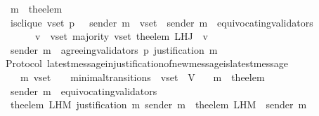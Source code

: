 \begin{isabellebody}
\ \ {\isasymlongrightarrow}\ m{\isacharprime}\ {\isacharequal}\ the{\isacharunderscore}elem\ {\isacharparenleft}{\isasymsigma}{\isacharprime}\ {\isacharminus}\ {\isasymsigma}{\isacharparenright}\isanewline
\ \ {\isasymlongrightarrow}\ is{\isacharunderscore}clique\ {\isacharparenleft}v{\isacharunderscore}set{\isacharcomma}\ p{\isacharcomma}\ {\isasymsigma}{\isacharparenright}\ {\isasymand}\ sender\ m{\isacharprime}\ {\isasymin}\ v{\isacharunderscore}set\ {\isasymand}\ sender\ m{\isacharprime}\ {\isasymnotin}\ equivocating{\isacharunderscore}validators\ {\isasymsigma}{\isacharprime}\isanewline
\ \ \ \ \ \ {\isasymand}\ {\isacharparenleft}{\isasymforall}\ v\ {\isasymin}\ v{\isacharunderscore}set{\isachardot}\ majority\ {\isacharparenleft}v{\isacharunderscore}set{\isacharcomma}\ the{\isacharunderscore}elem\ {\isacharparenleft}L{\isacharunderscore}H{\isacharunderscore}J\ {\isasymsigma}\ v{\isacharparenright}{\isacharparenright}{\isacharparenright}\ \isanewline
\ \ {\isasymlongrightarrow}\ sender\ m{\isacharprime}\ {\isasymin}\ agreeing{\isacharunderscore}validators\ {\isacharparenleft}p{\isacharcomma}\ justification\ m{\isacharprime}{\isacharparenright}{\isachardoublequoteclose}\isanewline
%
\isadelimproof
\ \ %
\endisadelimproof
%
\isatagproof
{}\isamarkupfalse%
%
\endisatagproof
{\isafoldproof}%
%
\isadelimproof
\isanewline
%
\endisadelimproof
\isanewline
\isanewline
\isanewline
\isanewline
\isanewline
\isanewline
\isanewline
{}\isamarkupfalse%
\ {\isacharparenleft}\ Protocol{\isacharparenright}\ latest{\isacharunderscore}message{\isacharunderscore}in{\isacharunderscore}justification{\isacharunderscore}of{\isacharunderscore}new{\isacharunderscore}message{\isacharunderscore}is{\isacharunderscore}latest{\isacharunderscore}message\ {\isacharcolon}\isanewline
\ \ {\isachardoublequoteopen}{\isasymforall}\ {\isasymsigma}\ {\isasymsigma}{\isacharprime}\ m{\isacharprime}\ v{\isacharunderscore}set{\isachardot}\ {\isacharparenleft}{\isasymsigma}{\isacharcomma}\ {\isasymsigma}{\isacharprime}{\isacharparenright}\ {\isasymin}\ minimal{\isacharunderscore}transitions\ {\isasymand}\ v{\isacharunderscore}set\ {\isasymsubseteq}\ V\isanewline
\ \ {\isasymlongrightarrow}\ m{\isacharprime}\ {\isacharequal}\ the{\isacharunderscore}elem\ {\isacharparenleft}{\isasymsigma}{\isacharprime}\ {\isacharminus}\ {\isasymsigma}{\isacharparenright}\isanewline
\ \ {\isasymlongrightarrow}\ sender\ m{\isacharprime}\ {\isasymnotin}\ equivocating{\isacharunderscore}validators\ {\isasymsigma}{\isacharprime}\isanewline
\ \ {\isasymlongrightarrow}\ the{\isacharunderscore}elem\ {\isacharparenleft}L{\isacharunderscore}H{\isacharunderscore}M\ {\isacharparenleft}justification\ m{\isacharprime}{\isacharparenright}\ {\isacharparenleft}sender\ m{\isacharprime}{\isacharparenright}{\isacharparenright}\ {\isacharequal}\ the{\isacharunderscore}elem\ {\isacharparenleft}L{\isacharunderscore}H{\isacharunderscore}M\ {\isasymsigma}\ {\isacharparenleft}sender\ m{\isacharprime}{\isacharparenright}{\isacharparenright}{\isachardoublequoteclose}\isanewline

\end{isabellebody}
